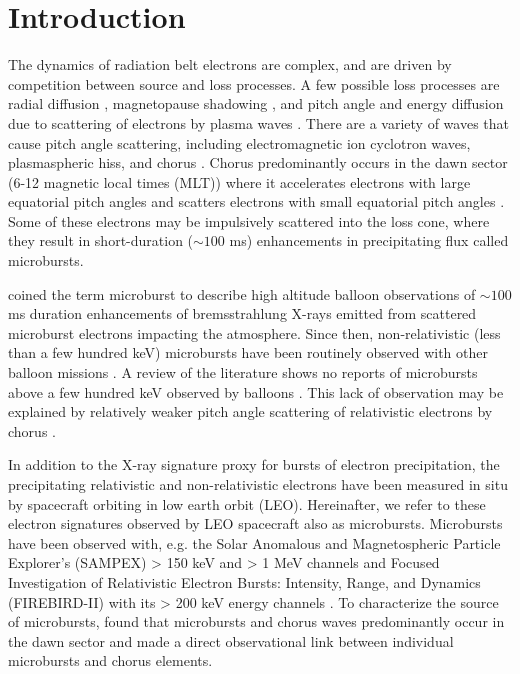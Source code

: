 \documentclass[draft, linenumbers]{agujournal}
\begin{document}
\section{Introduction}\label{Intro}
The dynamics of radiation belt electrons are complex, and are driven by competition between source and loss processes. A few possible loss processes are radial diffusion \citep{Shprits2004}, magnetopause shadowing \citep{Ukhorskiy2006}, and pitch angle and energy diffusion due to scattering of electrons by plasma waves \citep[e.g.][]{Abel1998_1, Summers1998, Meredith2002, Selesnick2003, Horne2003, Thorne2005, Mozer2018}. There are a variety of waves that cause pitch angle scattering, including electromagnetic ion cyclotron waves, plasmaspheric hiss, and chorus \citep{Millan2007, Thorne2010}. Chorus predominantly occurs in the dawn sector (6-12 magnetic local times (MLT)) \citep{Li2009} where it accelerates electrons with large equatorial pitch angles and scatters electrons with small equatorial pitch angles \citep{Horne2003}. Some of these electrons may be impulsively scattered into the loss cone, where they result in short-duration ($\sim 100$ ms) enhancements in precipitating flux called microbursts.

\citet{Anderson1964} coined the term microburst to describe high altitude balloon observations of $\sim 100$ ms duration enhancements of bremsstrahlung X-rays emitted from scattered microburst electrons impacting the atmosphere. Since then, non-relativistic (less than a few hundred keV) microbursts have been routinely observed with other balloon missions \citep[e.g.][]{Parks1967, Woodger2015, Anderson2017}. A review of the literature shows no reports of microbursts above a few hundred keV observed by balloons \citep{Millan2002, Woodger2015}. This lack of observation may be explained by relatively weaker pitch angle scattering of relativistic electrons by chorus \citep{Lee2012}. 

In addition to the X-ray signature proxy for bursts of electron precipitation, the precipitating relativistic and non-relativistic electrons have been measured in situ by spacecraft orbiting in low earth orbit (LEO). Hereinafter, we refer to these electron signatures observed by LEO spacecraft also as microbursts. Microbursts have been observed with, e.g. the Solar Anomalous and Magnetospheric Particle Explorer's (SAMPEX) > 150 keV and > 1 MeV channels \citep{Nakamura1995, Nakamura2000, Blake1996, Lorentzen2001a, Lorentzen2001b, O'Brien2003, O'Brien2004, Blum2015} and Focused Investigation of Relativistic Electron Bursts: Intensity, Range, and Dynamics (FIREBIRD-II) with its > 200 keV energy channels \citep{Crew2016, Anderson2017, Breneman2017}. To characterize the source of microbursts, \citet{Lorentzen2001b} found that microbursts and chorus waves predominantly occur in the dawn sector and \citet{Breneman2017} made a direct observational link between individual microbursts and chorus elements.
\end{document}
